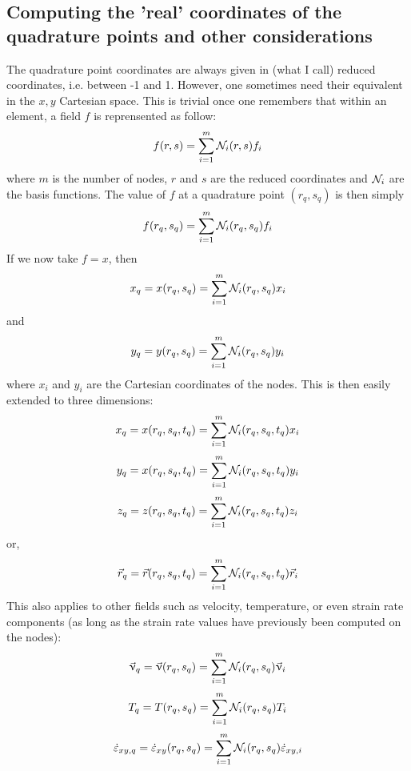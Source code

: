  
\subsection{Computing the 'real' coordinates of the quadrature points and other considerations}

The quadrature point coordinates are always given in (what I call) reduced coordinates, i.e. between 
-1 and 1.
However, one sometimes need their equivalent in the $x,y$ Cartesian space. 
This is trivial once one remembers that within an element, a field $f$ is reprensented 
as follow:
\[
f(r,s) = \sum_{i=1}^{m} {\mathcal{N}}_{i}(r,s) f_i
\]
where $m$ is the number of nodes, $r$ and $s$ are the reduced coordinates 
and ${\mathcal{N}}_i$ are the basis functions. 
The value of $f$ at a quadrature point $(r_q,s_q)$ is then simply
\[
f(r_q,s_q) = \sum_{i=1}^{m} {\mathcal{N}}_{i}(r_q,s_q) f_i
\]
If we now take $f=x$, then
\[
x_q =x(r_q,s_q) = \sum_{i=1}^{m} {\mathcal{N}}_{i}(r_q,s_q) x_i
\]
and
\[
y_q =y(r_q,s_q) = \sum_{i=1}^{m} {\mathcal{N}}_{i}(r_q,s_q) y_i
\]
where $x_i$ and $y_i$ are the Cartesian coordinates of the nodes.
This is then easily extended to three dimensions:
\[
x_q =x(r_q,s_q,t_q) = \sum_{i=1}^{m} {\mathcal{N}}_{i}(r_q,s_q,t_q) x_i
\]
\[
y_q =x(r_q,s_q,t_q) = \sum_{i=1}^{m} {\mathcal{N}}_{i}(r_q,s_q,t_q) y_i
\]
\[
z_q =z(r_q,s_q,t_q) = \sum_{i=1}^{m} {\mathcal{N}}_{i}(r_q,s_q,t_q) z_i
\]
or, 
\[
\vec{r}_q =\vec{r}(r_q,s_q,t_q) = \sum_{i=1}^{m} {\mathcal{N}}_{i}(r_q,s_q,t_q) \vec{r}_i
\]
This also applies to other fields such as velocity, temperature, or even strain rate components 
(as long as the strain rate values have previously been computed on the nodes): 
\[
\vec{\upnu}_q =\vec{\upnu}(r_q,s_q) = \sum_{i=1}^{m} {\mathcal{N}}_{i}(r_q,s_q) \vec{\upnu}_i
\]
\[
T_q =T(r_q,s_q) = \sum_{i=1}^{m} {\mathcal{N}}_{i}(r_q,s_q) T_i
\]
\[
\dot{\varepsilon}_{xy,q} 
= \dot{\varepsilon}_{xy} (r_q,s_q) = \sum_{i=1}^{m} {\mathcal{N}}_{i}(r_q,s_q)  \dot{\varepsilon}_{xy,i}
\]













